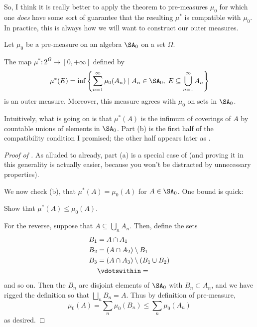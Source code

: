 So, I think it is really better to apply the theorem to pre-measures $\mu_0$
for which one \emph{does} have some sort of guarantee
that the resulting $\mu^\ast$ is compatible with $\mu_0$.
In practice, this is always how we will want to construct our outer measures.
\begin{theorem}
	\label{thm:construct_outer}
	Let $\mu_0$ be a pre-measure on an algebra $\SA_0$ on a set $\Omega$.
	\begin{enumerate}[(a)]
		\ii The map $\mu^\ast \colon 2^\Omega \to [0,+\infty]$ defined by
		\[ \mu^\ast(E) = \inf \left\{ \sum_{n=1}^\infty \mu_0(A_n) \mid
			A_n \in \SA_0, \; E \subseteq \bigcup_{n=1}^\infty A_n \right\} \]
		is an outer measure.
		\ii Moreover, this measure agrees with $\mu_0$ on sets in $\SA_0$.
	\end{enumerate}
\end{theorem}
Intuitively, what is going on is that
$\mu^\ast(A)$ is the infimum of coverings of $A$ by
countable unions of elements in $\SA_0$.
Part (b) is the first half of the compatibility condition I promised;
the other half appears later as .

\begin{proof}
	[Proof of ]
	As alluded to already, part (a)
	is a special case of 
	(and proving it in this generality is actually easier,
	because you won't be distracted by unnecessary properties).

	We now check (b), that $\mu^\ast(A) = \mu_0(A)$ for $A \in \SA_0$.
	One bound is quick:
	\begin{ques}
		Show that $\mu^\ast(A) \le \mu_0(A)$.
	\end{ques}
	For the reverse, suppose that $A \subseteq \bigcup_n A_n$.
	Then, define the sets
	\begin{align*}
		B_1 &= A \cap A_1 \\
		B_2 &= (A \cap A_2) \setminus B_1 \\
		B_3 &= (A \cap A_3) \setminus (B_1 \cup B_2) \\
		&\vdotswithin=
	\end{align*}
	and so on.
	Then the $B_n$ are disjoint elements of $\SA_0$ with $B_n \subset A_n$,
	and we have rigged the definition so that $\bigsqcup_n B_n = A$.
	Thus by definition of pre-measure,
	\[ \mu_0(A) = \sum_n \mu_0(B_n) \le \sum_n \mu_0(A_n) \]
	as desired.
\end{proof}

